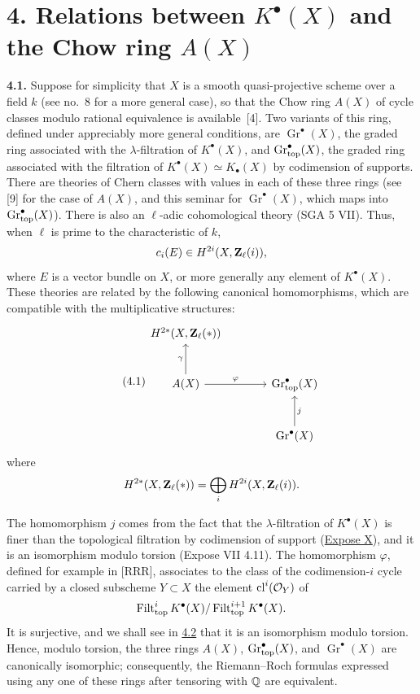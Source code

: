 \section*{4. Relations between $K^\bullet(X)$ and the Chow ring $A(X)$}

\noindent{}\textbf{4.1.}
Suppose for simplicity that $X$ is a smooth quasi-projective scheme over a
field $k$ (see no.~8 for a more general case), so that the Chow ring $A(X)$
of cycle classes modulo rational equivalence is available~[4]. Two variants
of this ring, defined under appreciably more general conditions, are
$\operatorname{Gr}^\bullet(X)$, the graded ring associated with the
$\lambda$-filtration of $K^\bullet(X)$, and $\operatorname{Gr}_{\mathrm{top}}^\bullet(X)$, the graded
ring associated with the filtration of
$K^\bullet(X)\simeq K_\bullet(X)$ by codimension of supports. There are
theories of Chern classes with values in each of these three rings (see [9]
for the case of $A(X)$, and this seminar for
$\operatorname{Gr}^\bullet(X)$, which maps into $\operatorname{Gr}_{\mathrm{top}}^\bullet(X)$). There is
also an $\ell$-adic cohomological theory (SGA 5 VII). Thus, when $\ell$ is
prime to the characteristic of $k$,
\[
 c_i(E)\in H^{2i}(X,\mathbf Z_\ell(i)),
\]
where $E$ is a vector bundle on $X$, or more generally any element of
$K^\bullet(X)$. These theories are related by the following canonical
homomorphisms, which are compatible with the multiplicative structures:
\begin{equation*}\tag{4.1}
\begin{tikzcd}[column sep=large,row sep=large]
 H^{2*}(X,\Zell(*)) & {} \\
 A(X) \arrow[u,"\gamma"] \arrow[r,"\varphi"] & \Gtop^\bullet(X) \\
 {} & \operatorname{Gr}^\bullet(X) \arrow[u,"j"']
\end{tikzcd}
\end{equation*}
where
\[
 H^{2*}(X,\mathbf Z_\ell(*))=\bigoplus_i H^{2i}(X,\mathbf Z_\ell(i)).
\]

The homomorphism $j$ comes from the fact that the $\lambda$-filtration of
$K^\bullet(X)$ is finer than the topological filtration by codimension of
support (\hyperlink{sga6.e10.expose}{Expose X}), and it is an isomorphism modulo torsion (Expose VII
4.11). The homomorphism $\varphi$, defined for example in [RRR], associates
to the class of the codimension-$i$ cycle carried by a closed subscheme
$Y\subset X$ the element $\operatorname{cl}^i(\mathcal O_Y)$ of
\[
 \operatorname{Filt}_{\mathrm{top}}^i K^\bullet(X)/
 \operatorname{Filt}_{\mathrm{top}}^{i+1}K^\bullet(X).
\]
It is surjective, and we shall see in \hyperlink{sga6.e14.para.4-2}{4.2} that it is an isomorphism modulo
torsion. Hence, modulo torsion, the three rings $A(X)$,
$\operatorname{Gr}_{\mathrm{top}}^\bullet(X)$, and $\operatorname{Gr}^\bullet(X)$ are canonically
isomorphic; consequently, the Riemann--Roch formulas expressed using any
one of these rings after tensoring with $\mathbb Q$ are equivalent.

